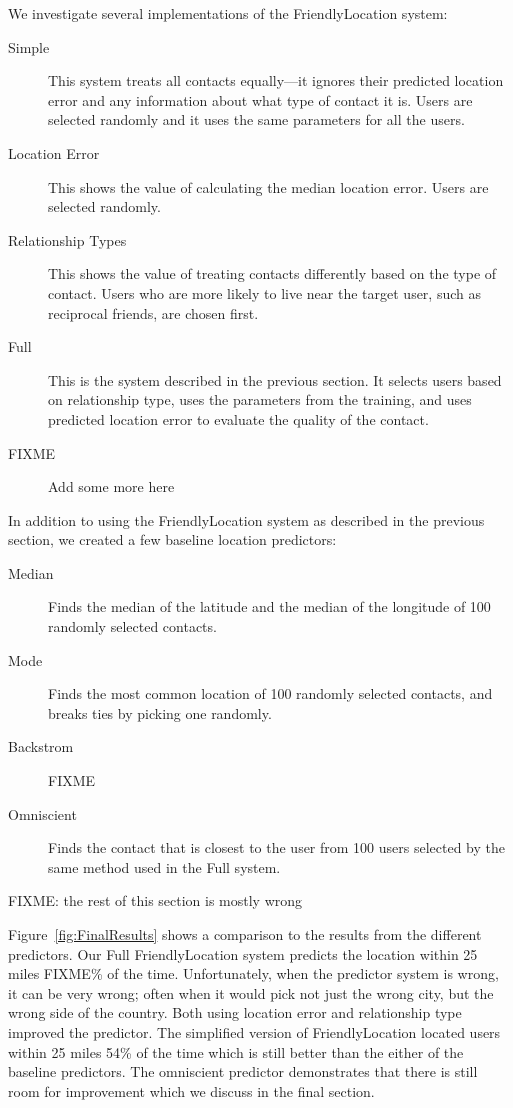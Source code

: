 We investigate several implementations of the FriendlyLocation system:
\begin{description}
\item[Simple] This system treats all contacts equally---it ignores their
predicted location error and any information about what type of contact it is.
Users are selected randomly and it uses the same parameters for all the users.
\item[Location Error] This shows the value of calculating the median location
error. Users are selected randomly.
\item[Relationship Types] This shows the value of treating contacts differently
based on the type of contact.
Users who are more likely to live near the target user, such as reciprocal
friends, are chosen first.
\item[Full] This is the system described in the previous section. It selects
users based on relationship type, uses the parameters from the training, and
uses predicted location error to evaluate the quality of the contact.
\item[FIXME] Add some more here
\end{description}

In addition to using the FriendlyLocation system as described in the previous
section, we created a few baseline location predictors:
\begin{description}
\item[Median] Finds the median of the latitude and the median of the longitude
of 100 randomly selected contacts.
\item[Mode] Finds the most common location of 100 randomly selected contacts,
and breaks ties by picking one randomly.
\item[Backstrom] FIXME
\item[Omniscient] Finds the contact that is closest to the user from 100 users
selected by the same method used in the Full system.
\end{description}

FIXME: the rest of this section is mostly wrong

Figure~\ref{fig:FinalResults} shows a comparison to the results from the 
different predictors.
Our Full FriendlyLocation system predicts the location within 25 miles FIXME\% of
the time.
Unfortunately, when the predictor system is wrong, it can be very wrong; often
when it would pick not just the wrong city, but the wrong side of the
country.
Both using location error and relationship type improved the predictor.  The
simplified version of FriendlyLocation located users within 25 miles 54\% of
the time which is still better than the either of the baseline predictors.
The omniscient predictor demonstrates that there is still room for improvement
which we discuss in the final section.

